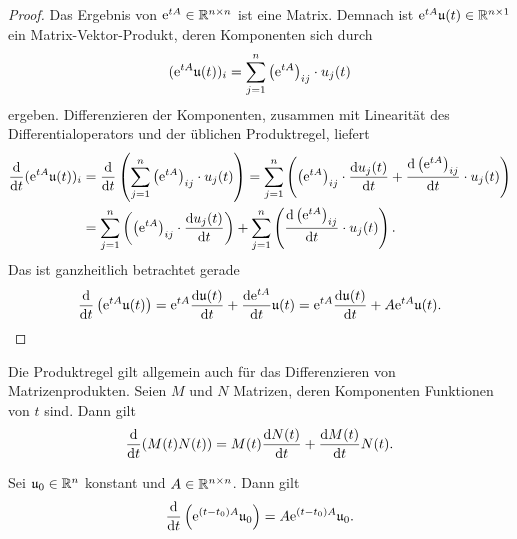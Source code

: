 \begin{proof}
    Das Ergebnis von $\mathrm{e}^{t A} \in \mathbb{R}^{n \times n}$ ist eine Matrix.
    Demnach ist $\mathrm{e}^{t A} \mathfrak{u}(t) \in \mathbb{R}^{n \times 1}$ ein Matrix-Vektor-Produkt, deren Komponenten sich durch
    \begin{equation*}
        (\mathrm{e}^{t A} \mathfrak{u}(t))_i = \sum^n_{j=1} \left( \mathrm{e}^{t A} \right)_{ij} \cdot u_j(t)
    \end{equation*}
    ergeben.
    Differenzieren der Komponenten, zusammen mit Linearität des Differentialoperators und der üblichen Produktregel, liefert
    \begin{align*}
        \frac{\mathrm{d} }{\mathrm{d} t}(\mathrm{e}^{t A} \mathfrak{u}(t))_i
        &= \frac{\mathrm{d} }{\mathrm{d} t} \left( \sum^n_{j=1} \left( \mathrm{e}^{t A} \right)_{ij} \cdot u_j(t) \right)
            = \sum^n_{j=1} \left( \left( \mathrm{e}^{t A} \right)_{ij} \cdot \frac{\mathrm{d} u_j(t)}{\mathrm{d} t} + \frac{\mathrm{d} \left( \mathrm{e}^{t A} \right)_{ij}}{\mathrm{d} t} \cdot u_j(t) \right)\\
        &= \sum^n_{j=1} \left( \left( \mathrm{e}^{t A} \right)_{ij} \cdot \frac{\mathrm{d} u_j(t)}{\mathrm{d} t} \right)
            +  \sum^n_{j=1} \left( \frac{\mathrm{d} \left( \mathrm{e}^{t A} \right)_{ij}}{\mathrm{d} t} \cdot u_j(t) \right).
    \end{align*}
    Das ist ganzheitlich betrachtet gerade
    \begin{equation*}
        \frac{\mathrm{d} }{\mathrm{d} t} \left( \mathrm{e}^{t A} \mathfrak{u}(t) \right) = \mathrm{e}^{t A} \frac{\mathrm{d} \mathfrak{u}(t)}{\mathrm{d} t} + \frac{\mathrm{d} \mathrm{e}^{t A}}{\mathrm{d} t} \mathfrak{u}(t)
        = \mathrm{e}^{t A} \frac{\mathrm{d} \mathfrak{u}(t)}{\mathrm{d} t} + A \mathrm{e}^{t A} \mathfrak{u}(t).
    \end{equation*}
\end{proof}

\begin{remark*}
    Die Produktregel gilt allgemein auch für das Differenzieren von Matrizenprodukten.
    Seien $M$ und $N$ Matrizen, deren Komponenten Funktionen von $t$ sind.
    Dann gilt
    \begin{equation*}
        \frac{\mathrm{d} }{\mathrm{d} t}(M(t) N(t)) = M(t) \frac{\mathrm{d} N(t)}{\mathrm{d} t} + \frac{\mathrm{d} M(t)}{\mathrm{d} t} N(t).
    \end{equation*}
\end{remark*}

\begin{corollary}\label{thm:matrixexp-derivative-corollary}
    Sei $\mathfrak{u}_0 \in \mathbb{R}^n$ konstant und $A \in \mathbb{R}^{n \times n}$.
    Dann gilt
    \begin{equation*}
        \frac{\mathrm{d} }{\mathrm{d} t} \left( \mathrm{e}^{(t - t_0) A} \mathfrak{u}_0 \right) = A \mathrm{e}^{(t - t_0) A} \mathfrak{u}_0.
    \end{equation*}
\end{corollary}

